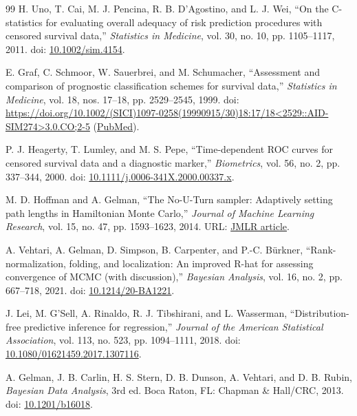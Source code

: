\documentclass[12pt]{article}
\begin{document}
\begin{thebibliography}{99}
H. Uno, T. Cai, M. J. Pencina, R. B. D'Agostino, and L. J. Wei, ``On the
C-statistics for evaluating overall adequacy of risk prediction procedures
with censored survival data,'' \textit{Statistics in Medicine}, vol. 30,
no. 10, pp. 1105--1117, 2011.
doi: \href{https://doi.org/10.1002/sim.4154}{10.1002/sim.4154}.

E. Graf, C. Schmoor, W. Sauerbrei, and M. Schumacher, ``Assessment and
comparison of prognostic classification schemes for survival data,''
\textit{Statistics in Medicine}, vol. 18, nos. 17--18, pp. 2529--2545, 1999.
doi: \url{https://doi.org/10.1002/(SICI)1097-0258(19990915/30)18:17/18<2529::AID-SIM274>3.0.CO;2-5} (\href{https://pubmed.ncbi.nlm.nih.gov/10474158/}{PubMed}).

P. J. Heagerty, T. Lumley, and M. S. Pepe, ``Time-dependent ROC curves for
censored survival data and a diagnostic marker,'' \textit{Biometrics},
vol. 56, no. 2, pp. 337--344, 2000.
doi: \href{https://doi.org/10.1111/j.0006-341X.2000.00337.x}{10.1111/j.0006-341X.2000.00337.x}.

M. D. Hoffman and A. Gelman, ``The No-U-Turn sampler: Adaptively setting path
lengths in Hamiltonian Monte Carlo,'' \textit{Journal of Machine Learning Research},
vol. 15, no. 47, pp. 1593--1623, 2014.
URL: \href{https://www.jmlr.org/papers/v15/hoffman14a.html}{JMLR article}.

A. Vehtari, A. Gelman, D. Simpson, B. Carpenter, and P.-C. Bürkner,
``Rank-normalization, folding, and localization: An improved R-hat for assessing
convergence of MCMC (with discussion),'' \textit{Bayesian Analysis}, vol. 16,
no. 2, pp. 667--718, 2021.
doi: \href{https://doi.org/10.1214/20-BA1221}{10.1214/20-BA1221}.

J. Lei, M. G'Sell, A. Rinaldo, R. J. Tibshirani, and L. Wasserman,
``Distribution-free predictive inference for regression,''
\textit{Journal of the American Statistical Association}, vol. 113, no. 523,
pp. 1094--1111, 2018.
doi: \href{https://doi.org/10.1080/01621459.2017.1307116}{10.1080/01621459.2017.1307116}.

A. Gelman, J. B. Carlin, H. S. Stern, D. B. Dunson, A. Vehtari, and D. B. Rubin,
\textit{Bayesian Data Analysis}, 3rd ed. Boca Raton, FL: Chapman \& Hall/CRC, 2013.
doi: \href{https://doi.org/10.1201/b16018}{10.1201/b16018}.

\end{thebibliography}
\end{document}
